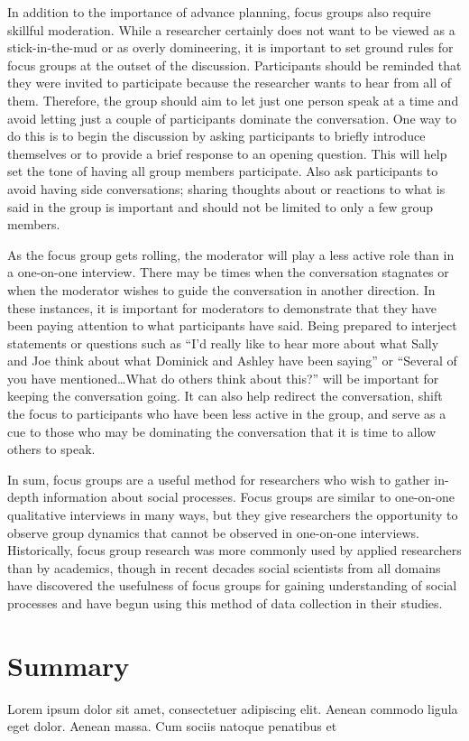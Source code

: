In addition to the importance of advance planning, focus groups also require skillful moderation. While a researcher certainly does not want to be viewed as a stick-in-the-mud or as overly domineering, it is important to set ground rules for focus groups at the outset of the discussion. Participants should be reminded that they were invited to participate because the researcher wants to hear from all of them. Therefore, the group should aim to let just one person speak at a time and avoid letting just a couple of participants dominate the conversation. One way to do this is to begin the discussion by asking participants to briefly introduce themselves or to provide a brief response to an opening question. This will help set the tone of having all group members participate. Also ask participants to avoid having side conversations; sharing thoughts about or reactions to what is said in the group is important and should not be limited to only a few group members.

As the focus group gets rolling, the moderator will play a less active role than in a one-on-one interview. There may be times when the conversation stagnates or when the moderator wishes to guide the conversation in another direction. In these instances, it is important for moderators to demonstrate that they have been paying attention to what participants have said. Being prepared to interject statements or questions such as ``I'd really like to hear more about what Sally and Joe think about what Dominick and Ashley have been saying'' or ``Several of you have mentioned\ldots What do others think about this?'' will be important for keeping the conversation going. It can also help redirect the conversation, shift the focus to participants who have been less active in the group, and serve as a cue to those who may be dominating the conversation that it is time to allow others to speak.

In sum, focus groups are a useful method for researchers who wish to gather in-depth information about social processes. Focus groups are similar to one-on-one qualitative interviews in many ways, but they give researchers the opportunity to observe group dynamics that cannot be observed in one-on-one interviews. Historically, focus group research was more commonly used by applied researchers than by academics, though in recent decades social scientists from all domains have discovered the usefulness of focus groups for gaining understanding of social processes and have begun using this method of data collection in their studies.

\section{Summary}\label{ch10:summary}

Lorem ipsum dolor sit amet, consectetuer adipiscing elit. Aenean commodo ligula eget dolor. Aenean massa. Cum sociis natoque penatibus et

